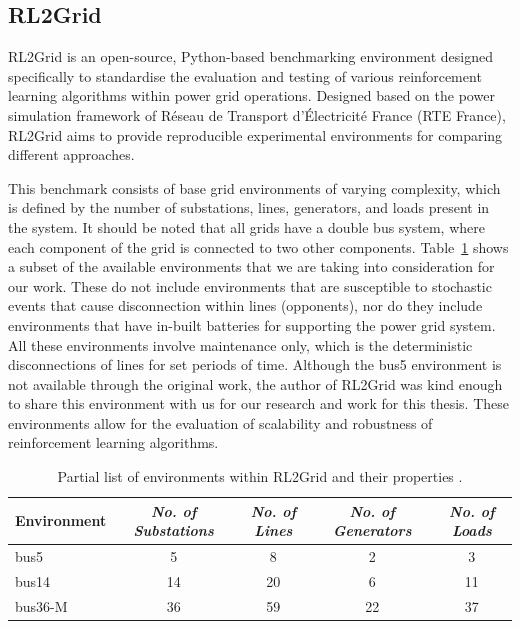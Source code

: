 \subsection{RL2Grid}

RL2Grid \cite{marchesini2025rl2grid} is an open-source, Python-based benchmarking environment designed specifically to standardise the evaluation and testing of various reinforcement learning algorithms within power grid operations. Designed based on the power simulation framework of Réseau de Transport d'Électricité France (RTE France), RL2Grid aims to provide reproducible experimental environments for comparing different approaches.

This benchmark consists of base grid environments of varying complexity, which is defined by the number of substations, lines, generators, and loads present in the system. It should be noted that all grids have a double bus system, where each component of the grid is connected to two other components. Table~\ref{tab:rl2grid_envs} shows a subset of the available environments that we are taking into consideration for our work. These do not include environments that are susceptible to stochastic events that cause disconnection within lines (opponents), nor do they include environments that have in-built batteries for supporting the power grid system. All these environments involve maintenance only, which is the deterministic disconnections of lines for set periods of time. Although the bus5 environment is not available through the original work, the author of RL2Grid \cite{marchesini2025rl2grid} was kind enough to share this environment with us for our research and work for this thesis. These environments allow for the evaluation of scalability and robustness of reinforcement learning algorithms.

\begin{table}[h]
\centering
\caption{Partial list of environments within RL2Grid and their properties \cite{marchesini2025rl2grid}.}
\label{tab:rl2grid_envs}
\begin{tabular}{lcccc}
\toprule
\textbf{Environment} & \textit{No. of Substations} & \textit{No. of Lines} & \textit{No. of Generators} & \textit{No. of Loads} \\
\midrule
bus5         & 5  & 8  & 2  & 3 \\
bus14        & 14  & 20  & 6  & 11 \\
bus36-M      & 36  & 59  & 22 & 37 \\
\bottomrule
\end{tabular}
\end{table}

